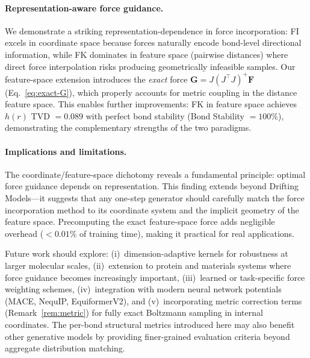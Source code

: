 \documentclass[11pt]{article}
\newcommand{\bF}{\mathbf{F}}
\newcommand{\bG}{\mathbf{G}}
\begin{document}
\paragraph{Representation-aware force guidance.}
We demonstrate a striking representation-dependence in force incorporation: FI excels in coordinate space because forces naturally encode bond-level directional information, while FK dominates in feature space (pairwise distances) where direct force interpolation risks producing geometrically infeasible samples.
Our feature-space extension introduces the \emph{exact} force $\bG = J(J^\top J)^+\bF$ (Eq.~\ref{eq:exact-G}), which properly accounts for metric coupling in the distance feature space.
This enables further improvements: FK in feature space achieves $h(r)$ TVD $= 0.089$ with perfect bond stability (Bond Stability $= 100\%$), demonstrating the complementary strengths of the two paradigms.

\paragraph{Implications and limitations.}
The coordinate/feature-space dichotomy reveals a fundamental principle: optimal force guidance depends on representation.
This finding extends beyond Drifting Models---it suggests that any one-step generator should carefully match the force incorporation method to its coordinate system and the implicit geometry of the feature space.
Precomputing the exact feature-space force adds negligible overhead ($<0.01\%$ of training time), making it practical for real applications.

Future work should explore: (i)~dimension-adaptive kernels for robustness at larger molecular scales, (ii)~extension to protein and materials systems where force guidance becomes increasingly important, (iii)~learned or task-specific force weighting schemes, (iv)~integration with modern neural network potentials (MACE, NequIP, EquiformerV2), and (v)~incorporating metric correction terms (Remark~\ref{rem:metric}) for fully exact Boltzmann sampling in internal coordinates.
The per-bond structural metrics introduced here may also benefit other generative models by providing finer-grained evaluation criteria beyond aggregate distribution matching.


\end{document}
